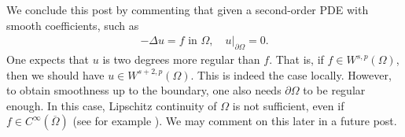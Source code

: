 \documentclass[
    a4paper,
    DIV=14,
    abstract=true,
    numbers=noenddot
]
{scrartcl}
\theoremstyle{definition}
\newtheorem{exercise}{Exercise}
\newtheorem*{hint}{Hint}
\newcommand{\wh}[1]{\widehat{#1}}
\newcommand{\br}[1]{\left\langle#1\right\rangle}
\renewcommand{\norm}[1]{\left\lVert #1 \right\rVert}\renewcommand{\abs}[1]{\left| #1 \right|}
\renewcommand{\d}{\,\mathrm{d}}\newcommand{\dx}{\,\mathrm{d}x}
\newcommand\restr[2]{\left.#1\right|_{#2}}
\newcommand{\E}{\mathbb{E}}
\newcommand{\R}{\mathbb{R}}
\newcommand{\Ww}{\mathcal{W}}
\begin{document}







We conclude this post by commenting that given a second-order PDE with smooth coefficients, such as
\begin{align*}
    - \Delta u =f \text{ in } \Omega , \quad \restr{u}{\partial \Omega }= 0.
\end{align*}
One expects that $u$ is two degrees more regular than $f$. That is, if $f \in W^{s,p}(\Omega )$, then we should have $u \in W^{s+2,p}(\Omega )$. This is indeed the case locally. However, to obtain smoothness up to the boundary, one also needs $\partial \Omega $  to be regular enough. In this case, Lipschitz continuity of $\Omega $ is not sufficient, even if $f \in C^\infty(\overline{\Omega } )$ (see for example \cite{savare1998regularity}). We may comment on this later in a future post.







\end{document}
